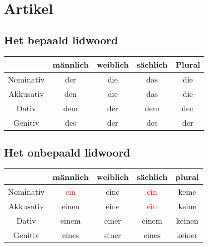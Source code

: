 \documentclass[main.tex]{subfiles}
\begin{document}
\chapter{Artikel}
\section{Het bepaald lidwoord}
\begin{tabular}{|c|c|c|c|c|}
\hline 
\rowcolor{gray}
 & männlich & weiblich & sächlich & Plural \\ 
\hline 
\cellcolor[gray]{0.8}Nominativ & der & die & das & die \\ 
\hline 
\cellcolor[gray]{0.8}Akkusativ & den & die & das & die \\ 
\hline 
\cellcolor[gray]{0.8}Dativ & dem & der & dem & den \\ 
\hline 
\cellcolor[gray]{0.8}Genitiv & des & der & des & der \\ 
\hline 
\end{tabular} 

\section{Het onbepaald lidwoord}


\begin{tabular}{|c|c|c|c|c|}
\hline 
\rowcolor{gray}
& männlich & weiblich & sächlich & plural \\ 
\hline 
\cellcolor[gray]{0.8}Nominativ & \textcolor{red}{ein} & eine & \textcolor{red}{ein} & keine \\ 
\hline 
\cellcolor[gray]{0.8}Akkusativ & einen & eine & \textcolor{red}{ein} & keine \\ 
\hline 
\cellcolor[gray]{0.8}Dativ & einem & einer & einem & keinen \\ 
\hline 
\cellcolor[gray]{0.8}Genitiv & eines & einer & eines & keiner \\ 
\hline 
\end{tabular} 
\end{document}
